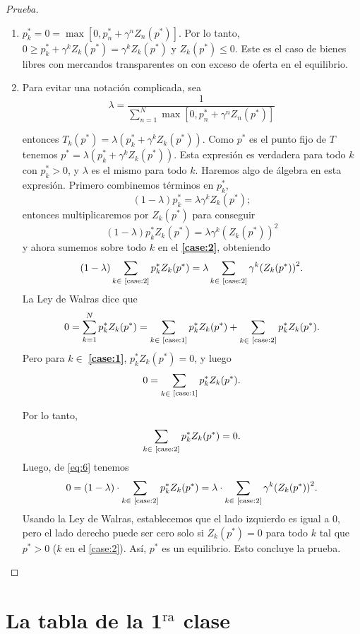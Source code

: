 \documentclass[10pt,a4paper]{article}
\theoremstyle{definition}
\newcommand{\walrass}{Ley de Walras}
\newcommand{\mmax}[2]{\max\left[#1,#2\right]}
\newcommand{\pzp}[1]{\pp_{#1}Z_{#1}(\pp)}
\newcommand{\gzp}[2][]{\gamma^{#2}Z_{#2}(p^{#1})}
\newcommand{\pp}{p^{\ast}}
\begin{document}
\begin{proof}[Prueba]
\begin{enumerate}[label={\bfseries Caso \arabic{enumi}},ref=Caso \arabic{enumi},wide =\parindent,leftmargin=2.5em]
\item $\pp_k=0=\mmax{0}{\pp_n+\gzp[\ast]{n}}$. Por lo tanto, $0\geq \pp_k+\gzp[\ast]{k}=\gzp[\ast]{k}$ y $Z_k(\pp)\leq0$. Este es el caso de bienes libres con mercandos transparentes on con exceso de oferta en el equilibrio.\label{case:1}
	
\item Para evitar una notación complicada, sea\label{case:2}
$$
\lambda=\frac{1}{\sum\limits_{n=1}^N\mmax{0}{\pp_n+\gzp[\ast]{n}}}
$$

entonces $T_k(\pp)=\lambda(\pp_k+\gzp[\ast]{k})$. Como $\pp$ es el punto fijo de $T$ tenemos $\pp=\lambda\left(\pp_k+\gzp[\ast]{k}\right)$. Esta expresión es verdadera para todo $k$ con $\pp_k>0$, y $\lambda$ es el mismo para todo $k$. Haremos algo de álgebra en esta expresión. Primero combinemos términos en $\pp_k$,
$$
\left(1-\lambda\right)\pp_k=\lambda\gzp[\ast]{k};
$$
entonces multiplicaremos por $Z_k(\pp)$ para conseguir
\begin{equation}\label{eq:6}
\left(1-\lambda\right)\pp_kZ_k(\pp)=\lambda\gamma^{k}{\left(Z_k(p^{\ast})\right)}^{2}
\end{equation}
y ahora sumemos sobre todo $k$ en el \textbf{\ref{case:2}}, obteniendo
$$
(1-\lambda)\sum_{\substack{k\in\text{ \ref{case:2}}}}\pzp{k}=\lambda\sum_{\substack{k\in\text{ \ref{case:2}}}}\gamma^{k}{\left(Z_k(p^{\ast})\right)}^{2}.
$$
La \walrass{} dice que
$$
0=\sum_{k=1}^{N}\pzp{k}=\sum_{\substack{k\in\text{ \ref{case:1}}}}\pzp{k}+\sum_{\substack{k\in}\text{ \ref{case:2}}}\pzp{k}.
$$
Pero para $k\in$ \textbf{\ref{case:1}}, $\pp_kZ_k(\pp)=0$, y luego
$$
0=\sum_{\substack{k\in}\text{ \ref{case:1}}}\pzp{k}.
$$

Por lo tanto,
$$
\sum_{k\in\text{ \ref{case:2}}}\pzp{k}=0.
$$
Luego, de \eqref{eq:6} tenemos
$$
0=\left(1-\lambda\right)\cdot\sum_{\substack{k\in\text{ \ref{case:2}}}}\pzp{k}=\lambda\cdot\sum_{\substack{k\in\text{ \ref{case:2}}}}\gamma^{k}{\left(Z_k(p^{\ast})\right)}^{2}.
$$
Usando la \walrass, establecemos que el lado izquierdo es igual a $0$, pero el lado derecho puede ser cero solo si $Z_k(\pp)=0$ para todo $k$ tal que $\pp>0$ ($k$ en el \ref{case:2}). Así, $\pp$ es un equilibrio. Esto concluye la prueba.
\end{enumerate}
\end{proof}

\section[Una tabla]{La tabla de la 1$^{\text{ra}}$ clase}
\end{document}
